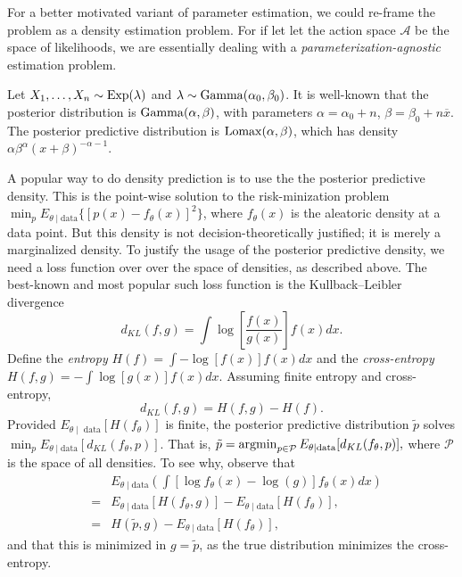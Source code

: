 For a better motivated variant of parameter estimation, we could re-frame the problem as a density estimation problem. For if let let the action space $\mathcal{A}$ be the space of likelihoods, we are essentially dealing with a \emph{parameterization-agnostic} estimation problem. 
\begin{example}
\label{exa:exponential estimation} Let $X_{1},\ldots,X_{n}\sim\operatorname{Exp}(\lambda)$
and $\lambda\sim\operatorname{Gamma}(\alpha_{0},\beta_{0})$. It is well-known
that the posterior distribution is $\operatorname{Gamma}(\alpha,\beta)$, with
parameters $\alpha=\alpha_{0}+n$, $\beta=\beta_{0}+n\overline{x}$.
The posterior predictive distribution is $\operatorname{Lomax}(\alpha,\beta)$,
which has density $\alpha\beta^{\alpha}(x+\beta)^{-\alpha-1}$. 

A popular way to do density prediction is to use the the posterior
predictive density. This\emph{ }is the point-wise solution to the
risk-minization problem $\min_{p}E_{\theta\mid\textrm{data}}\{[p(x)-f_{\theta}(x)]^{2}\}$,
where $f_{\theta}(x)$ is the aleatoric density at a data point. But
this density is not decision-theoretically justified; it is merely
a marginalized density. To justify the usage of the posterior predictive
density, we need a loss function over over the space of densities, as described above.
The best-known and most popular such loss function is the Kullback--Leibler\emph{
}divergence \parencite{Kullback1951-kv}
\begin{equation}
d_{KL}(f,g)=\int\log\left[\frac{f(x)}{g(x)}\right]f(x)dx.\label{eq:Kullback-Leibler}
\end{equation}
 Define the \emph{entropy} $H(f)=\int-\log[f(x)]f(x)dx$ and the \emph{cross-entropy}
$H(f,g)=-\int\log[g(x)]f(x)dx$. Assuming finite entropy and cross-entropy,
\begin{equation}
d_{KL}(f,g)=H(f,g)-H(f).\label{eq:Kullback--Leibler(entropy)}
\end{equation}
Provided $E_{\theta\mid\textrm{ data}}[H(f_{\theta})]$ is finite,
the posterior predictive distribution $\tilde{p}$ solves $\min_{p}E_{\theta\mid\textrm{data}}[d_{KL}(f_{\theta},p)]$.
That is, $\tilde{p}=\operatorname{argmin}_{p\in\mathcal{P}}E_{\theta\mid\textrm{data}}[d_{KL}(f_{\theta},p)],$
where $\mathcal{P}$ is the space of all densities. To see why, observe
that
\begin{eqnarray}
 &  & E_{\theta\mid\textrm{data}}\left(\int[\log f_{\theta}(x)-\log(g)]f_{\theta}(x)dx\right)\nonumber \\  
 & = & E_{\theta\mid\textrm{data}}[H(f_{\theta},g)]-E_{\theta\mid\textrm{data}}[H(f_{\theta})],\label{eq:cross-entropy equality}\\
 & = & H(\tilde{p},g)-E_{\theta\mid\textrm{data}}[H(f_{\theta})],\nonumber 
\end{eqnarray}
and that this is minimized in $g=\tilde{p}$, as the true distribution
minimizes the cross-entropy. 


\end{example}
